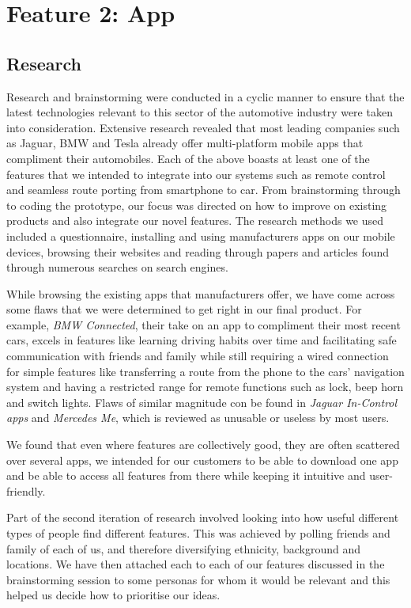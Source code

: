 \documentclass{article}
\begin{document}
%
%
\section{Feature 2: App}\label{sec:app}

\subsection{Research}\label{ssec:app-research}
Research and brainstorming were conducted in a cyclic manner to ensure that the latest technologies relevant to this sector of the automotive industry were taken into consideration. Extensive research revealed that most leading companies such as Jaguar, BMW and Tesla already offer multi-platform mobile apps that compliment their automobiles. Each of the above boasts at least one of the features that we intended to integrate into our systems such as remote control and seamless route porting from smartphone to car. From brainstorming through to coding the prototype, our focus was directed on how to improve on existing products and also integrate our novel features.
The research methods we used included a questionnaire, installing and using manufacturers apps on our mobile devices, browsing their websites and reading through papers and articles found through numerous searches on search engines.

While browsing the existing apps that manufacturers offer, we have come across some flaws that  we were determined to get right in our final product. For example, \textit{BMW Connected}, their take on an app to compliment their most recent cars, excels in features like learning driving habits over time and facilitating safe communication with friends and family while still requiring a wired connection for simple features like transferring a route from the phone to the cars' navigation system and having a restricted range for remote functions such as lock, beep horn and switch lights. Flaws of similar magnitude con be found in \textit{Jaguar In-Control apps} and \textit{Mercedes Me}, which is reviewed as unusable or useless by most users.

We found that even where features are collectively good, they are often scattered over several apps, we intended for our customers to be able to download one app and be able to access all features from there while keeping it intuitive and user-friendly.

Part of the second iteration of research involved looking into how useful different types of people find different features. This was achieved by polling friends and family of each of us, and therefore diversifying ethnicity, background and locations. We have then attached each to each of our features discussed in the brainstorming session to some personas for whom it would be relevant and this helped us decide how to prioritise our ideas.
\end{document}
